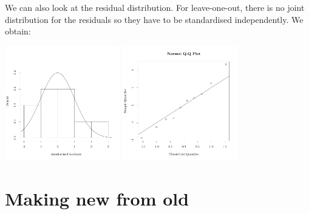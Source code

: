 \begin{frame}{}
We can also look at the residual distribution. For leave-one-out, there is no joint distribution for the residuals so they have to be standardised independently. We obtain:
\begin{center}
\includegraphics[height=5cm]{3_gaussian_process_regression/figures/R/VALID_crossvalhist} \qquad
\includegraphics[height=5cm]{3_gaussian_process_regression/figures/R/VALID_crossvalqqplot}
\end{center}
\end{frame}


\section{Making new from old}
\subsection{}

